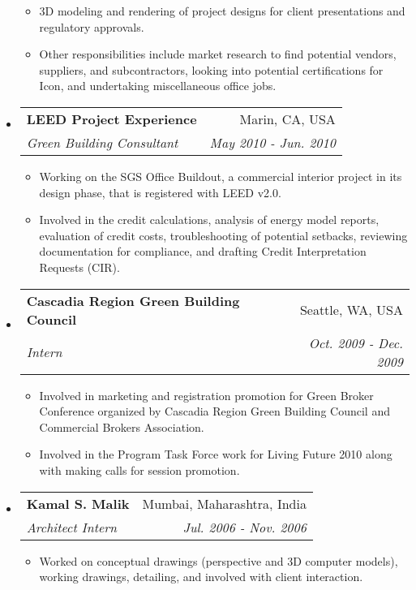 \documentclass[letterpaper,10pt]{article}
\makeatletter
\newcommand{\resitem}[1]{\item #1}
\newcommand{\ressubheading}[4]{
  \begin{tabular*}{7in}{l@{\extracolsep{\fill}}r}
    \textbf{#1} & #2 \\
    \textit{#3} & \textit{#4} \\
\end{tabular*}}
\makeatother
\begin{document}
\begin{itemize}
\begin{itemize}
    \resitem{3D modeling and rendering of project designs for client presentations and regulatory approvals.}
    \resitem{Other responsibilities include market research to find potential vendors, suppliers, and subcontractors, looking into potential certifications for Icon, and undertaking miscellaneous office jobs.}
  \end{itemize}
  \pagebreak
\item
  \ressubheading{LEED Project Experience}{Marin, CA, USA}{Green Building Consultant}{May 2010 - Jun. 2010}
  \begin{itemize}
    \resitem{Working on the SGS Office Buildout, a commercial interior project in its design phase, that is registered with LEED v2.0.}
    \resitem{Involved in the credit calculations, analysis of energy model reports, evaluation of credit costs, troubleshooting of potential setbacks, reviewing documentation for compliance, and drafting Credit Interpretation Requests (CIR).}
  \end{itemize}

\item
  \ressubheading{Cascadia Region Green Building Council}{Seattle, WA, USA}{Intern}{Oct. 2009 - Dec. 2009}
  \begin{itemize}
    \resitem{Involved in marketing and registration promotion for Green Broker Conference organized by Cascadia Region Green Building Council and Commercial Brokers Association.}
    \resitem{Involved in the Program Task Force work for Living Future 2010 along with making calls for session promotion.}
  \end{itemize}
\item
  \ressubheading{Kamal S. Malik}{Mumbai, Maharashtra, India}{Architect Intern}{Jul. 2006 - Nov. 2006}
  \begin{itemize}
    \resitem{Worked on conceptual drawings (perspective and 3D computer models), working drawings, detailing, and involved with client interaction.}
  \end{itemize}
  
\end{itemize}
\end{document}
